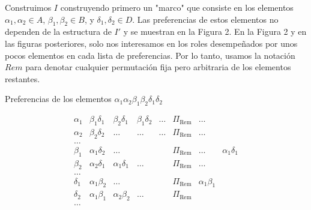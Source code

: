 \documentclass{article}
\begin{document}
Construimos $I$ construyendo primero un "marco" que consiste en los elementos $\alpha_1, \alpha_2 \in A$, $\beta_1, \beta_2 \in B$, y $\delta_1, \delta_2 \in D$. Las preferencias de estos elementos no dependen de la estructura de $I'$ y se muestran en la Figura 2. En la Figura 2 y en las figuras posteriores, solo nos interesamos en los roles desempeñados por unos pocos elementos en cada lista de preferencias. Por lo tanto, usamos la notación $Rem$ para denotar cualquier permutación fija pero arbitraria de los elementos restantes.



\begin{table}[h]
    \centering
    \caption{Preferencias de los elementos $\alpha_1 \alpha_2 \beta_1 \beta_2 \delta_1 \delta_2$}
    \[
    \begin{array}{c|cccccccc}
        \alpha_1 & \beta_1\delta_1 & \beta_2\delta_1 & \beta_1\delta_2 & \dots & \Pi_{\text{Rem}} & \dots \\
        \alpha_2 & \beta_2\delta_2 & \dots & \dots &\dots & \Pi_{\text{Rem}} & \dots \\
        \dots & & & & &  \\
        \hline
        \beta_1 & \alpha_1\delta_2 & \dots & & & \Pi_{\text{Rem}} & \dots & \alpha_1\delta_1 \\
        \beta_2 & \alpha_2\delta_1 & \alpha_1\delta_1 & \dots & &  \Pi_{\text{Rem}} & \dots \\
        \dots & & & & & \\
        \hline
        \delta_1 & \alpha_1\beta_2 & \dots &  & & \Pi_{\text{Rem}} & \alpha_1\beta_1 \\
        \delta_2 & \alpha_1\beta_1&  \alpha_2\beta_2 & \dots & & \Pi_{\text{Rem}} \\
        \dots & & & & & \\
    \end{array}
    \]
    \end{table}
\end{document}
